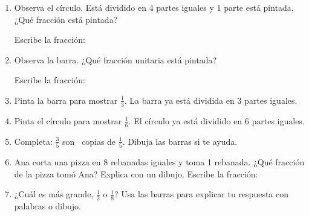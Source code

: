 \begin{wbpractice}
\begin{enumerate}
\item Observa el círculo. Está dividido en 4 partes iguales y 1 parte está pintada. ¿Qué fracción está pintada?
\begin{center}
\end{center}
Escribe la fracción: \wbfracbox
{}

\item Observa la barra. ¿Qué fracción unitaria está pintada?
\begin{center}
\end{center}
Escribe la fracción: \wbfracbox
{}

\item Pinta la barra para mostrar $\frac{1}{3}$. La barra ya está dividida en 3 partes iguales.
\begin{center}
\end{center}
\wbbox[1.5cm]

\item Pinta el círculo para mostrar $\frac{1}{6}$. El círculo ya está dividido en 6 partes iguales.
\begin{center}
\end{center}
\wbbox[1.5cm]

\item Completa: $\frac{3}{5}$ son \wbblank\ copias de $\frac{1}{5}$. Dibuja las barras si te ayuda.
\begin{center}
 \hspace{0.5cm} 
\end{center}

\item Ana corta una pizza en 8 rebanadas iguales y toma 1 rebanada. ¿Qué fracción de la pizza tomó Ana? Explica con un dibujo.
\wbbox[2cm]
Escribe la fracción: \wbfracbox
{}

\item ¿Cuál es más grande, $\frac{1}{2}$ o $\frac{1}{8}$? Usa las barras para explicar tu respuesta con palabras o dibujo.
\begin{center}
 \hspace{0.5cm} 
\end{center}
\end{enumerate}
\end{wbpractice}

